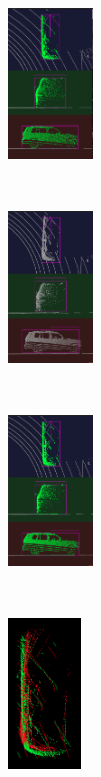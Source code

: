 \documentclass[letterpaper, 10 pt, conference]{ieeeconf}  %
\begin{document}
\begin{figure}[t]
	\centering
	\begin{subfigure}[t]{0.18\linewidth}
		\includegraphics[height=4cm]{./figures/reg-ref-3d}\\
		\caption{}\label{fig:box-ref}
	\end{subfigure}\hfill
	~
	\begin{subfigure}[t]{0.18\linewidth}
		\includegraphics[height=4cm]{./figures/reg-input-3d}\\
		\caption{}\label{fig:box-source}
	\end{subfigure}\hfill
	~
	\begin{subfigure}[t]{0.18\linewidth}
		\includegraphics[height=4cm]{./figures/reg-result-3d}\\
		\caption{}\label{fig:box-output}
	\end{subfigure}\hfill
	~
	\begin{subfigure}[t]{0.18\linewidth}
		\includegraphics[height=4cm]{./figures/reg-input}\\

\end{subfigure}
\end{figure}
\end{document}
